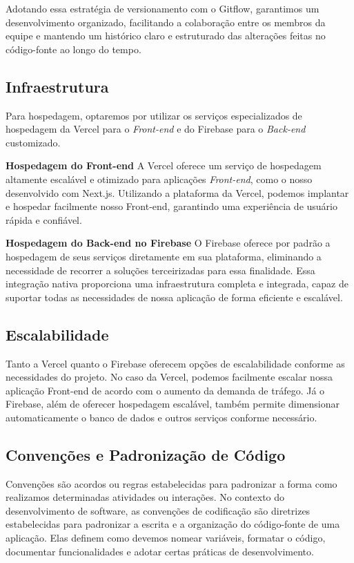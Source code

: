 Adotando essa estratégia de versionamento com o Gitflow, garantimos um desenvolvimento organizado, facilitando a colaboração entre os membros da equipe e mantendo um histórico claro e estruturado das alterações feitas no código-fonte ao longo do tempo.

\subsection{Infraestrutura}
Para hospedagem, optaremos por utilizar os serviços especializados de hospedagem da Vercel para o \textit{Front-end} e do Firebase para o \textit{Back-end} customizado.

\textbf{Hospedagem do Front-end} \newline
A Vercel oferece um serviço de hospedagem altamente escalável e otimizado para aplicações \textit{Front-end}, como o nosso desenvolvido com Next.js. Utilizando a plataforma da Vercel, podemos implantar e hospedar facilmente nosso Front-end, garantindo uma experiência de usuário rápida e confiável.

\textbf{Hospedagem do Back-end no Firebase} \newline
O Firebase oferece por padrão a hospedagem de seus serviços diretamente em sua plataforma, eliminando a necessidade de recorrer a soluções terceirizadas para essa finalidade. Essa integração nativa proporciona uma infraestrutura completa e integrada, capaz de suportar todas as necessidades de nossa aplicação de forma eficiente e escalável.

\subsection{Escalabilidade}
Tanto a Vercel quanto o Firebase oferecem opções de escalabilidade conforme as necessidades do projeto. No caso da Vercel, podemos facilmente escalar nossa aplicação Front-end de acordo com o aumento da demanda de tráfego. Já o Firebase, além de oferecer hospedagem escalável, também permite dimensionar automaticamente o banco de dados e outros serviços conforme necessário.

\subsection{Convenções e Padronização de Código}

Convenções são acordos ou regras estabelecidas para padronizar a forma como realizamos determinadas atividades ou interações. No contexto do desenvolvimento de software, as convenções de codificação são diretrizes estabelecidas para padronizar a escrita e a organização do código-fonte de uma aplicação. Elas definem como devemos nomear variáveis, formatar o código, documentar funcionalidades e adotar certas práticas de desenvolvimento.

